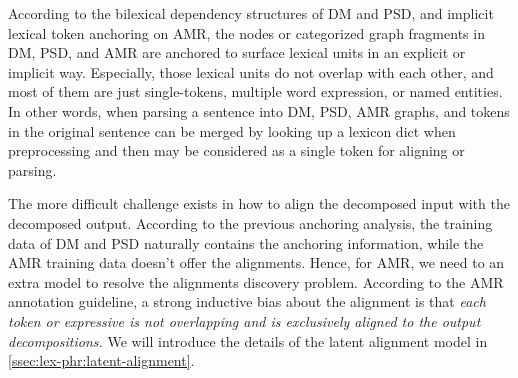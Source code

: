 According to the bilexical dependency structures of DM and PSD, and
implicit lexical token anchoring on AMR, the nodes or categorized graph
fragments in DM, PSD, and AMR are anchored to surface lexical units in
an explicit or implicit way. Especially, those lexical units do not
overlap with each other, and most of them are just single-tokens,
multiple word expression, or named entities. In other words, when
parsing a sentence into DM, PSD, AMR graphs, and tokens in the original
sentence can be merged by looking up a lexicon dict when preprocessing
and then may be considered as a single token for aligning or parsing.

The more difficult challenge exists in how to align the decomposed
input with the decomposed output. According to the previous anchoring
analysis, the training data of DM and PSD naturally contains the
anchoring information, while the AMR training data doesn't offer the
alignments. Hence, for AMR, we need to an extra model to resolve the
alignments discovery problem. According to the AMR annotation
guideline, a strong inductive bias about the alignment is that
\emph{each token or expressive is not overlapping and is
  exclusively aligned to the output decompositions.} We will
introduce the details of the latent alignment model in
\autoref{ssec:lex-phr:latent-alignment}.

